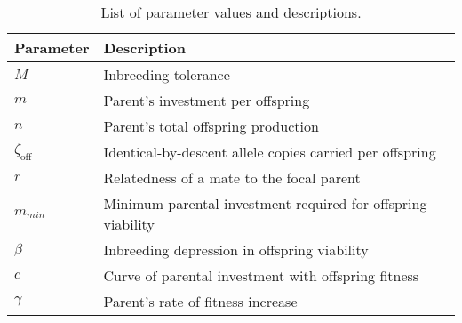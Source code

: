 \documentclass[12pt]{article}
\begin{document}
\clearpage
\singlespacing
\begin{table}[H]
\begin{center}
\begin{tabular}{ll}
\hline
Parameter & Description & \\
\hline
$M$                     & Inbreeding tolerance  & \\
$m$                     & Parent's investment per offspring & \\
$n$                     & Parent's total offspring production & \\
$\zeta_{\textrm{off}}$  & Identical-by-descent allele copies carried per offspring & \\
$r$                     & Relatedness of a mate to the focal parent & \\
$m_{min}$               & Minimum parental investment required for offspring viability & \\
$\beta$                 & Inbreeding depression in offspring viability & \\
$c$                     & Curve of parental investment with offspring fitness & \\
$\gamma$                & Parent's rate of fitness increase & \\
\hline	
\end{tabular}
\end{center}
\caption{List of parameter values and descriptions.}
\label{parameters}
\end{table}
\end{document}
